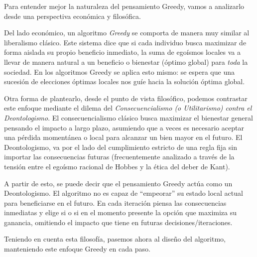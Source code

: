 Para entender mejor la naturaleza del pensamiento Greedy, vamos a analizarlo desde una perspectiva económica y filosófica.

Del lado económico, un algoritmo \textit{Greedy} se comporta de manera muy similar al liberalismo clásico. Este sistema dice que si cada individuo busca maximizar de forma aislada su propio beneficio inmediato, la suma de egoísmos locales va a llevar de manera natural a un beneficio o bienestar (óptimo global) para \textit{toda} la sociedad. En los algoritmos Greedy se aplica esto mismo: se espera que una sucesión de elecciones óptimas locales nos guíe hacia la solución óptima global.

Otra forma de plantearlo, desde el punto de vista filosófico, podemos contrastar este enfoque mediante el dilema del \textit{Consecuencialismo (o Utilitarismo) contra el Deontologismo}. El consecuencialismo clásico busca maximizar el bienestar general pensando el impacto a largo plazo, asumiendo que a veces es necesario aceptar una pérdida momentánea o local para alcanzar un bien mayor en el futuro. El Deontologismo, va por el lado del cumplimiento estricto de una regla fija sin importar las consecuencias futuras (frecuentemente analizado a través de la tensión entre el egoísmo racional de Hobbes y la ética del deber de Kant).

A partir de esto, se puede decir que el pensamiento Greedy actúa como un Deontologismo. El algoritmo no es capaz de ``empeorar'' su estado local actual para beneficiarse en el futuro. En cada iteración piensa las consecuencias inmediatas y elige si o si en el momento presente la opción que maximiza su ganancia, omitiendo el impacto que tiene en futuras decisiones/iteraciones.

Teniendo en cuenta esta filosofía, pasemos ahora al diseño del algoritmo, manteniendo este enfoque Greedy en cada paso.
